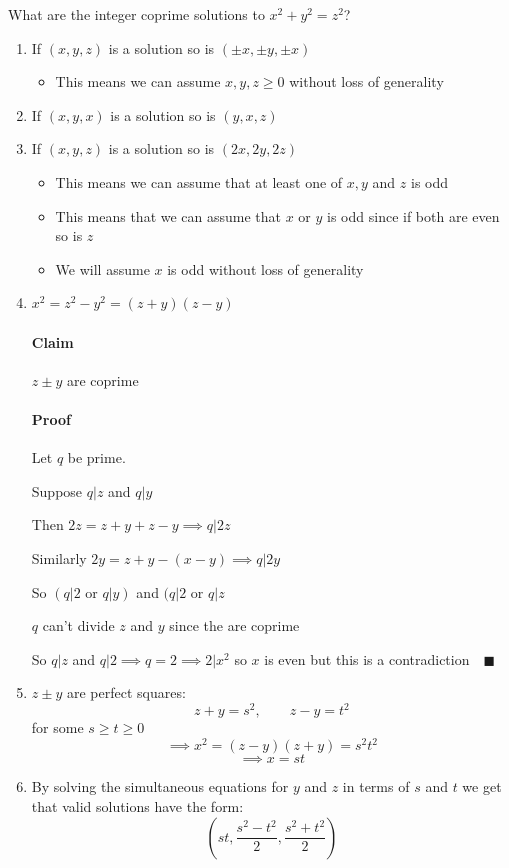 \documentclass{article}
\begin{document}
What are the integer coprime solutions to \(x^2+y^2 = z^2\)?

\begin{enumerate}
\item If \((x, y, z)\) is a solution so is \((\pm x, \pm y, \pm x)\)
\begin{itemize}
\item This means we can assume \(x, y, z\ge 0\) without loss of generality
\end{itemize}
\item If \((x, y, x)\) is a solution so is \((y, x, z)\)
\item If \((x, y, z)\) is a solution so is \((2x, 2y, 2z)\)
\begin{itemize}
\item This means we can assume that at least one of \(x, y\) and \(z\) is odd
\item This means that we can assume that \(x\) or \(y\) is odd since if both are even so is \(z\)
\item We will assume \(x\) is odd without loss of generality
\end{itemize}
\item \(x^2 = z^2 - y^2 = (z+y)(z-y)\)
\paragraph{Claim} \(z\pm y\) are coprime

\paragraph{Proof} Let \(q\) be prime.

Suppose \(q|z\) and \(q|y\)

Then \(2z = z+y+z-y\implies q|2z\)

Similarly \(2y = z+y -(x-y)\implies q|2y\)

So \((q|2\text{ or }q|y)\) and \((q|2\text{ or }q|z\)

\(q\) can't divide \(z\) and \(y\) since the are coprime

So \(q|z\) and \(q|2\implies q = 2\implies 2|x^2\) so \(x\) is even but this is a contradiction\(\quad\blacksquare\)
\item \(z \pm y\) are perfect squares:
\[z+y=s^2,\qquad z-y = t^2\]
for some \(s\ge t\ge 0\)
\[\implies x^2 = (z-y)(z+y) = s^2t^2\]
\[\implies x = st\]
\item By solving the simultaneous equations for \(y\) and \(z\) in terms of \(s\) and \(t\) we get that valid solutions have the form:
\[\left(st, \frac{s^2-t^2}{2}, \frac{s^2+t^2}{2}\right)\]
\end{enumerate}
\end{document}
